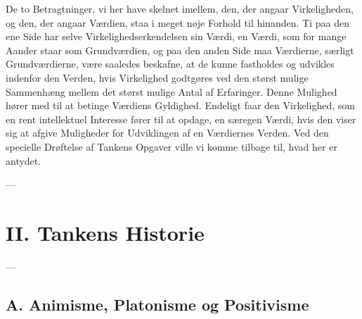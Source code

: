 \documentclass[12pt,a4paper]{book}
\newcommand{\opage}[1]{\marginnote{\footnotesize\textit{[#1]}}}
\begin{document}
De to Betragtninger, vi her have skelnet imellem, den, der angaar
Virkeligheden, og den, der angaar Værdien, staa i meget nøje Forhold til
hinanden. Ti paa den ene Side har selve Virkelighedserkendelsen sin
Værdi, en Værdi, som for mange Aander staar som Grundværdien, og paa den
anden Side maa Værdierne, særligt Grundværdierne, være saaledes beskafne,
at de kunne fastholdes og udvikles indenfor den Verden, hvis Virkelighed
godtgøres ved den størst mulige Sammenhæng mellem det størst mulige
Antal af Erfaringer. Denne Mulighed hører med til at betinge Værdiens
Gyldighed. Endeligt faar den Virkelighed, som en rent intellektuel
Interesse fører til at opdage, en særegen Værdi, hvis den viser sig at
afgive Muligheder for Udviklingen af en Værdiernes Verden. Ved den
specielle Drøftelse af Tankens Opgaver ville vi komme tilbage til, hvad
her er antydet.

\begin{center}---\end{center}

\opage{109} \chapter*{II. Tankens Historie}
\label{ch:historie}

\begin{center}---\end{center}

\section*{A. Animisme, Platonisme og Positivisme}
\label{sec:animisme}
\end{document}
